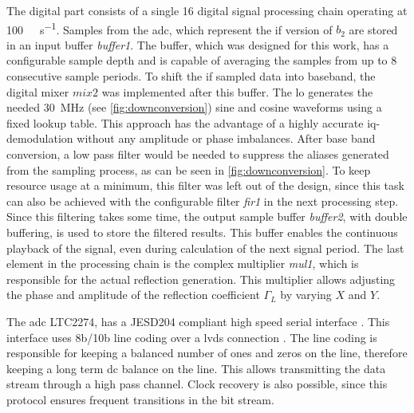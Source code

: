 \documentclass[12pt,a4paper,parskip=full,abstract=true,BCOR=12mm,twoside,open=right]{scrreprt}
\def\device#1{\textit{#1}}
\begin{document}
The digital part consists of a single \SI{16}{\bit} digital signal processing
chain operating at \SI{100}{\mega\samples\per\second}. Samples from
the \gls{adc}, which represent the \gls{if} version of $b_2$ are stored in an input
buffer \device{buffer1}. The buffer, which was designed for this work, has a configurable
sample depth and is capable of averaging the samples from up to 8 consecutive sample
periods. To shift the \gls{if} sampled data into baseband, the digital mixer $mix2$ was implemented
after this buffer. The \gls{lo} generates the needed \SI{30}{\mega\hertz} (see \cref{fig:downconversion})
sine and cosine waveforms using a fixed lookup table. This approach has the
advantage of a highly accurate \gls{iq}-demodulation without any amplitude or
phase imbalances. After base band conversion, a low pass filter would be needed to
suppress the aliases generated from the sampling process, as can be seen in
\cref{fig:downconversion}. To keep resource usage at a minimum, this filter was
left out of the design, since this task can also be achieved with the configurable
filter \device{fir1} in the next processing step. Since this filtering takes some time,
the output sample buffer \device{buffer2}, with double buffering, is used to store
the filtered results. This buffer enables the continuous playback of the signal, even
during calculation of the next signal period. The last element in the processing chain
is the complex multiplier \device{mul1}, which is responsible for the actual reflection
generation. This multiplier allows adjusting the phase and amplitude of the reflection
coefficient $\Gamma_L$ by varying $X$ and $Y$.

The \gls{adc} LTC2274, has a JESD204 compliant high speed serial interface \cite{ltc2274}.
This interface uses 8b/10b line coding over a \gls{lvds} connection \cite{jesd205B.01}. The line coding
is responsible for keeping a balanced number of ones and zeros on the line, therefore keeping a long term
\gls{dc} balance on the line. This allows transmitting the data stream through a high pass
channel. Clock recovery is also possible, since this protocol ensures frequent transitions
in the bit stream.
\end{document}
